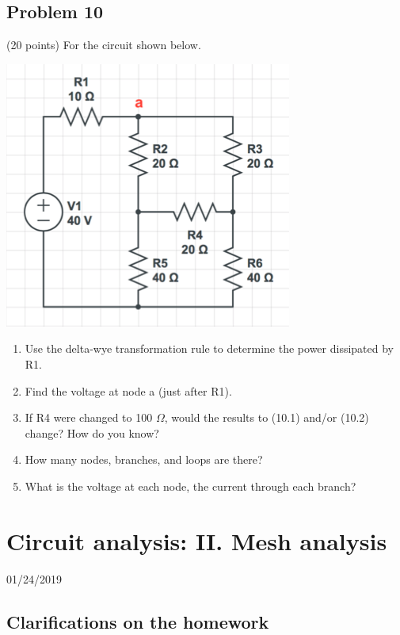 \documentclass[11pt]{book}
\begin{document}
\section{Problem 10}
(20 points) For the circuit shown below.
\begin{center}
	\includegraphics{figures/hw1.10.png}
\end{center}

\begin{enumerate}
	\item Use the delta-wye transformation rule to determine the power dissipated by R1.
	\item Find the voltage at node a (just after R1). 
	\item If R4 were changed to 100 $\Omega$, would the results to (10.1) and/or (10.2) change? How do you know?
	\item How many nodes, branches, and loops are there?
	\item What is the voltage at each node, the current through each branch?
\end{enumerate}




\setcounter{chapter}{4}



\chapter{Circuit analysis: II. Mesh analysis}
01/24/2019
\minitoc
\newpage
\section{Clarifications on the homework}
\end{document}
